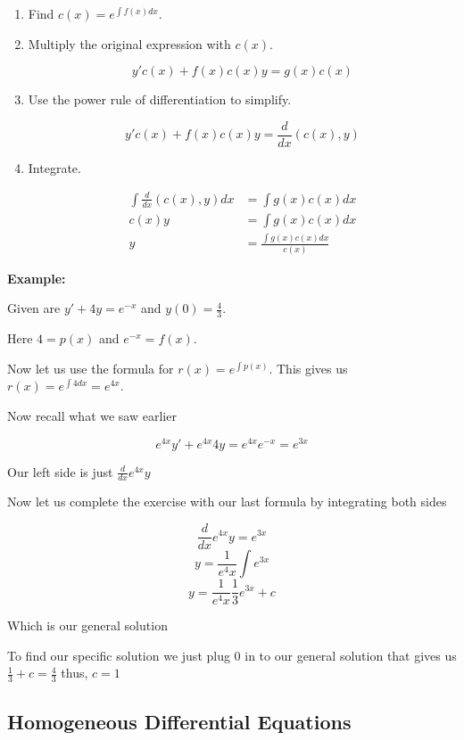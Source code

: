 \begin{enumerate} 
    
    \item Find \(c(x) = e^{\int f(x)dx}\).

    \item Multiply the original expression with \(c(x)\).

        \[
            y'c(x) + f(x)c(x)y = g(x)c(x)
        \]

    \item Use the power rule of differentiation to simplify.
        
        \[
            y'c(x) + f(x)c(x)y = \frac{d}{dx}\left(c(x), y\right)
        \]

    \item Integrate.

        \begin{align*}
            \int \frac{d}{dx}\left(c(x), y\right)dx &= \int g(x)c(x)dx \\
            c(x)y &= \int g(x)c(x)dx \\
            y &= \frac{\int g(x)c(x)dx}{c(x)}
        \end{align*}

\end{enumerate}

\textbf{Example:}

Given are \(y' + 4y = e^{-x}\) and \(y(0) = \frac{4}{3}\).

Here \(4 = p(x)\) and \(e^{-x} = f(x)\).

Now let us use the formula for \(r(x) = e^{\int p (x)}\). This gives us 
\(r(x) = e^{\int 4dx} = e^{4x}\).

Now recall what we saw earlier

\[
    e^{4x}y' + e^{4x}4y = e^{4x}e^{-x} = e^{3x}
\]

Our left side is just \(\frac{d}{dx} e^{4x}y\)

Now let us complete the exercise with our last formula by integrating both sides

\[
    \frac{d}{dx} e^{4x}y = e^{3x}
\]
\[
    y = \frac{1}{e^4x}\int e^{3x}
\]
\[
    y = \frac{1}{e^4x} \frac{1}{3}e^{3x} + c
\]

Which is our general solution

To find our specific solution we just plug 0 in to our general solution that gives us
\(\frac{1}{3} + c = \frac{4}{3}\) thus, \(c = 1\)

\subsection{Homogeneous Differential Equations}

